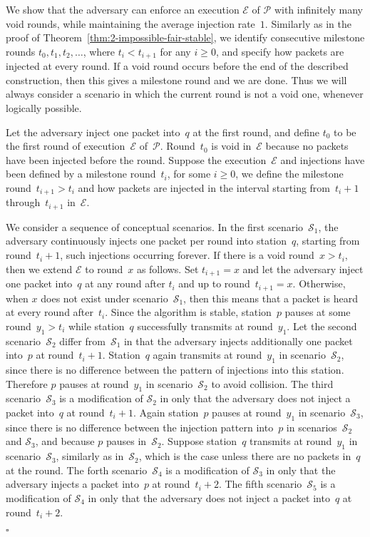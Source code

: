 \documentclass[11pt]{article}
\newcommand{\cE}{\mathcal{E}}
\newcommand{\cP}{\mathcal{P}}
\newcommand{\cS}{\mathcal{S}}
\newcommand{\qed}{\hfill $\square$ \smallbreak}
\newenvironment{proof}{\noindent{\bf Proof:}}{\qed}
\begin{document}
\begin{proof}
We show that the adversary can enforce an execution $\cE$ of $\cP$ with infinitely many void rounds, while maintaining the average injection rate~$1$.
Similarly as in the proof of  Theorem~\ref{thm:2-impossible-fair-stable}, we identify consecutive milestone rounds $t_{0}, t_{1},t_{2},\ldots$, where $t_{i}<t_{i+1}$ for any $i\ge 0$, and specify how packets are injected at every round.
If a void round occurs before the end of the described construction, then this gives a milestone round and we are done.
Thus we will always consider a scenario in which the current round is not a void one, whenever logically possible.

Let the adversary inject one packet into~$q$ at the first round, and define $t_{0}$ to be the first round of execution~$\cE$ of~$\cP$.
Round~$t_0$ is void in~$\cE$ because no packets have been injected before the round.
Suppose the execution~$\cE$ and injections have been defined by a milestone round~$t_{i}$, for some $i\ge 0$, we define the milestone round~$t_{i+1}>t_{i}$ and how packets are injected in the interval starting from~$t_{i}+1$ through~$t_{i+1}$ in~$\cE$.

We consider a sequence of conceptual scenarios.
In the first scenario~$\cS_1$, the adversary continuously injects one packet per round into station~$q$, starting from round~$t_{i}+1$, such injections occurring forever.
If there is a void round~$x>t_i$, then we extend $\cE$ to round~$x$ as follows.
Set $t_{i+1}=x$ and let the adversary inject one packet into~$q$ at any round after $t_i$ and up to round~$t_{i+1}=x$.
Otherwise, when $x$ does not exist under scenario~$\cS_1$, then this means that a packet is heard at every round after~$t_i$.
Since the algorithm is stable, station~$p$ pauses at some round~$y_1 > t_{i}$ while station~$q$ successfully transmits at round~$y_1$.
Let the second scenario~$\cS_2$ differ from~$\cS_1$ in that the adversary injects additionally one packet into~$p$ at round~$t_i+1$.
Station~$q$ again transmits at round~$y_1$ in scenario~$\cS_2$, since there is no difference between the pattern of injections into this station.
Therefore  $p$ pauses at round~$y_1$ in scenario~$\cS_2$ to avoid collision.
The third scenario~$\cS_3$ is a modification of $\cS_2$ in only that the adversary does not inject a packet into~$q$ at round~$t_i+1$.
Again station~$p$ pauses at round~$y_1$ in scenario~$\cS_3$, since there is no difference between the injection pattern into~$p$ in scenarios~$\cS_2$ and $\cS_3$, and because $p$ pauses in~$\cS_2$.
Suppose station~$q$  transmits at round~$y_1$ in scenario~$\cS_3$, similarly as in~$\cS_2$, which is the case unless there are no packets in~$q$ at the round.
The forth scenario~$\cS_4$ is a modification of $\cS_3$ in only that the adversary injects a packet into~$p$ at round~$t_i+2$.
The fifth scenario~$\cS_5$ is a modification of $\cS_4$ in only that the adversary does not inject a packet into~$q$ at round~$t_i+2$.


\end{proof}
\end{document}
